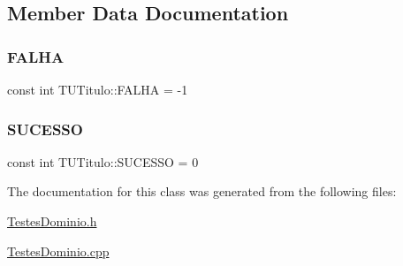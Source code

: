 \subsection{Member Data Documentation}
\mbox{\label{class_t_u_titulo_a5f60ebb41aa0607f6a7a4b825907b6ee}} 
\subsubsection{\texorpdfstring{F\+A\+L\+HA}{FALHA}}
{\footnotesize\ttfamily const int T\+U\+Titulo\+::\+F\+A\+L\+HA = -\/1\hspace{0.3cm}{\ttfamily [static]}}

\mbox{\label{class_t_u_titulo_aaea6696cee40d23798e3777c1e17688f}} 
\subsubsection{\texorpdfstring{S\+U\+C\+E\+S\+SO}{SUCESSO}}
{\footnotesize\ttfamily const int T\+U\+Titulo\+::\+S\+U\+C\+E\+S\+SO = 0\hspace{0.3cm}{\ttfamily [static]}}



The documentation for this class was generated from the following files\+:\begin{DoxyCompactItemize}
\item 
\hyperlink{_testes_dominio_8h}{Testes\+Dominio.\+h}\item 
\hyperlink{_testes_dominio_8cpp}{Testes\+Dominio.\+cpp}\end{DoxyCompactItemize}
